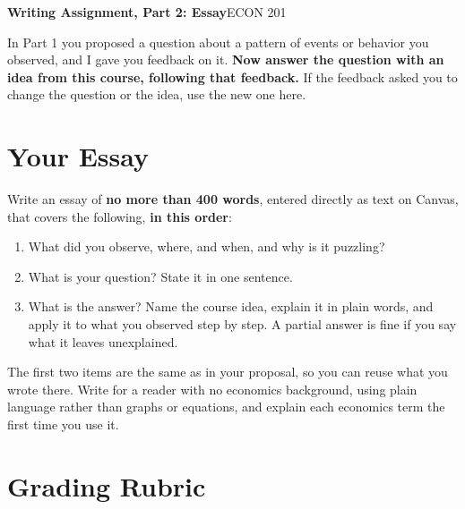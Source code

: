 \documentclass[11pt]{article}
\begin{document}
{\LARGE\bfseries\color{accent}Writing Assignment, Part 2: Essay}\hfill{\large\color{muted}ECON 201}\par
{}\par
{}\par
\vspace{4pt}

In Part 1 you proposed a question about a pattern of events or behavior you observed, and I gave you feedback on it. \textbf{Now answer the question with an idea from this course, following that feedback.} If the feedback asked you to change the question or the idea, use the new one here.

\section{Your Essay}

Write an essay of \textbf{no more than 400 words}, entered directly as text on Canvas, that covers the following, \textbf{in this order}:

\begin{enumerate}
  \item What did you observe, where, and when, and why is it puzzling?
  \item What is your question? State it in one sentence.
  \item What is the answer? Name the course idea, explain it in plain words, and apply it to what you observed step by step. A partial answer is fine if you say what it leaves unexplained.
\end{enumerate}

The first two items are the same as in your proposal, so you can reuse what you wrote there. Write for a reader with no economics background, using plain language rather than graphs or equations, and explain each economics term the first time you use it.

\section{Grading Rubric}
\end{document}
